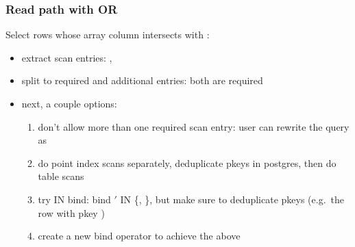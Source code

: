 \begin{frame}
  \frametitle{Read path with OR}
  Select rows whose array column intersects with :

  \pause

  \begin{itemize}
    \item extract scan entries: , 
      \pause
    \item split to required and additional entries: both are required
      \pause
    \item next, a couple options:
      \pause
      \begin{enumerate}
        \item don't allow more than one required scan entry: user can rewrite
          the query as 
          \pause
        \item do point index scans separately, deduplicate pkeys in postgres,
          then do table scans
          \pause
        \item try IN bind: bind $'$ IN \{,
          \}, but make sure to deduplicate pkeys (e.g.\ the row
          with pkey )
          \pause
        \item create a new bind operator to achieve the above
      \end{enumerate}
  \end{itemize}
\end{frame}
